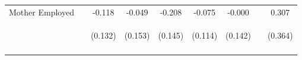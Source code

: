 \begin{tabular}{lcccccccc}
\noalign{\smallskip}Mother Employed &  & -0.118 & -0.049 & -0.208 & -0.075 & -0.000 &  & 0.307\\
 & \begin{footnotesize}\end{footnotesize} & \begin{footnotesize}(0.132)\end{footnotesize} & \begin{footnotesize}(0.153)\end{footnotesize} & \begin{footnotesize}(0.145)\end{footnotesize} & \begin{footnotesize}(0.114)\end{footnotesize} & \begin{footnotesize}(0.142)\end{footnotesize} & \begin{footnotesize}\end{footnotesize} & \begin{footnotesize}(0.364)\end{footnotesize}\\
\noalign{\smallskip}\hline\end{tabular}\\
